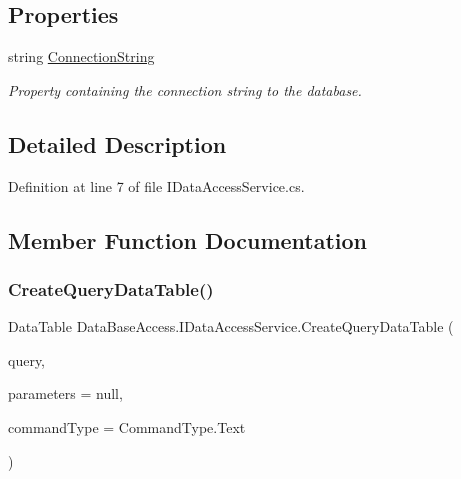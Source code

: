 \subsection*{Properties}
\begin{DoxyCompactItemize}
\item 
string \mbox{\hyperlink{interfaceDataBaseAccess_1_1IDataAccessService_aced282143a1c60f5cc534af50cf10b32}{Connection\+String}}
\begin{DoxyCompactList}\small\item\em Property containing the connection string to the database. \end{DoxyCompactList}\end{DoxyCompactItemize}


\subsection{Detailed Description}


Definition at line 7 of file I\+Data\+Access\+Service.\+cs.



\subsection{Member Function Documentation}
\mbox{\label{interfaceDataBaseAccess_1_1IDataAccessService_aaaa5bc38c85e15cac8b29e1df1e09638}} 
\subsubsection{\texorpdfstring{CreateQueryDataTable()}{CreateQueryDataTable()}}
{\footnotesize\ttfamily Data\+Table Data\+Base\+Access.\+I\+Data\+Access\+Service.\+Create\+Query\+Data\+Table (\begin{DoxyParamCaption}\item[{string}]{query,  }\item[{Dictionary$<$ string, object $>$}]{parameters = {\ttfamily null},  }\item[{Command\+Type}]{command\+Type = {\ttfamily CommandType.Text} }\end{DoxyParamCaption})}



